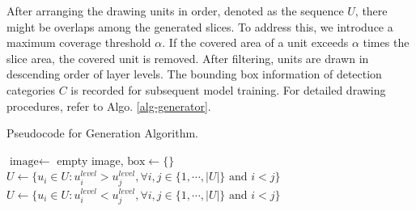\documentclass[runningheads]{llncs}
\newcounter{algorithm}
\begin{document}
\noindent After arranging the drawing units in order, denoted as the sequence $U$,
there might be overlaps among the generated slices. To address this,
we introduce a maximum coverage threshold $\alpha$. If the covered area of a unit exceeds $\alpha$ times the slice area,
the covered unit is removed. After filtering, units are drawn in descending order of layer levels.
The bounding box information of detection categories $C$ is recorded for subsequent model training.
For detailed drawing procedures, refer to Algo. \ref{alg-generator}. 
\vspace{-3ex}
\begin{algorithm}[ht]
	\caption{Pseudocode for Generation Algorithm.\label{alg-generator}}
	\IncMargin{2em}
	\DontPrintSemicolon
  $\text{image}\gets$ empty image, $\text{box}\gets \{\}$
  $U\gets \{u_i\in U: u_i^{level}>u_j^{level}, \forall i, j \in \{1,\cdots,|U|\} \text{~and~} i < j\}$\;
  $U\gets \{u_i\in U: u_i^{level}<u_j^{level}, \forall i, j \in \{1,\cdots,|U|\} \text{~and~} i < j\}$\;
\end{algorithm}
% 
\end{document}
